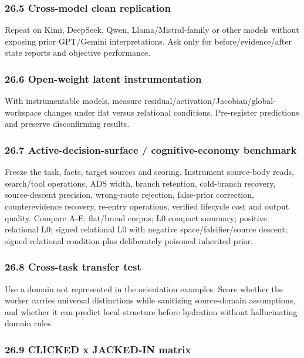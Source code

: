 \documentclass[
  10pt,
  letterpaper,
]{article}
\begin{document}
\subsubsection{26.5 Cross-model clean
replication}\label{265-cross-model-clean-replication}

Repeat on Kimi, DeepSeek, Qwen, Llama/Mistral-family or other models
without exposing prior GPT/Gemini interpretations. Ask only for
before/evidence/after state reports and objective performance.

\subsubsection{26.6 Open-weight latent
instrumentation}\label{266-open-weight-latent-instrumentation}

With instrumentable models, measure
residual/activation/Jacobian/global-workspace changes under flat versus
relational conditions. Pre-register predictions and preserve
disconfirming results.

\subsubsection{26.7 Active-decision-surface / cognitive-economy
benchmark}\label{267-active-decision-surface--cognitive-economy-benchmark}

Freeze the task, facts, target sources and scoring. Instrument
source-body reads, search/tool operations, ADS width, branch retention,
cold-branch recovery, source-descent precision, wrong-route rejection,
false-prior correction, counterevidence recovery, re-entry operations,
verified lifecycle cost and output quality. Compare A-E: flat/broad
corpus; L0 compact summary; positive relational L0; signed relational L0
with negative space/falsifier/source descent; signed relational
condition plus deliberately poisoned inherited prior.

\subsubsection{26.8 Cross-task transfer
test}\label{268-cross-task-transfer-test}

Use a domain not represented in the orientation examples. Score whether
the worker carries universal distinctions while sanitizing source-domain
assumptions, and whether it can predict local structure before hydration
without hallucinating domain rules.

\subsubsection{26.9 CLICKED x JACKED-IN
matrix}\label{269-clicked-x-jacked-in-matrix}
\end{document}

